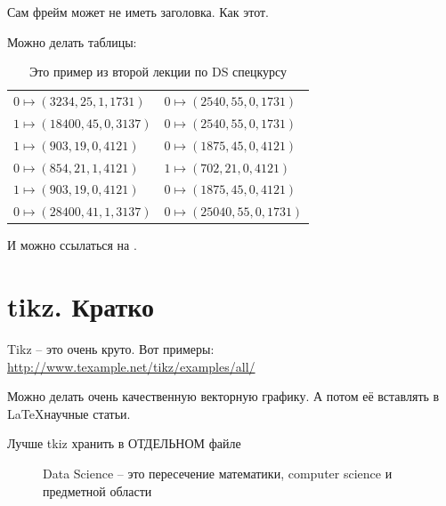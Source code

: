 \begin{frame}
	Сам фрейм может не иметь заголовка. Как этот.
\end{frame}

\begin{frame}
	Можно делать таблицы:

	\begin{center}
	\small 
		\begin{table}
		\begin{tabular}{ l l }
			$0 \mapsto (3234, 25, 1, 1731) $ &  $0 \mapsto (2540, 55, 0, 1731)$ \\
			$1 \mapsto (18400, 45, 0, 3137)$ & $0 \mapsto (2540, 55, 0, 1731)$  \\
			$1 \mapsto (903, 19, 0, 4121)$  & $0 \mapsto (1875, 45, 0, 4121)$  \\
			$0 \mapsto (854, 21, 1, 4121)$  & $1 \mapsto (702, 21, 0, 4121)$  \\
			$1 \mapsto (903, 19, 0, 4121)$  & $0 \mapsto (1875, 45, 0, 4121)$  \\
			$0 \mapsto (28400, 41, 1, 3137)$ & $0 \mapsto (25040, 55, 0, 1731)$  \\
		\end{tabular}
		\caption{Это пример из второй лекции по DS спецкурсу}
		\label{table:example}
		\end{table}
	\end{center}
	И можно ссылаться на .
\end{frame}

 
\section{tikz. Кратко}\label{section:tkiz}

\begin{frame}
Tikz -- это очень круто. Вот примеры: \url{http://www.texample.net/tikz/examples/all/}

Можно делать очень качественную векторную графику. 
А потом её вставлять в \LaTeX научные статьи.

\end{frame}

\begin{frame}
	Лучше tkiz хранить в ОТДЕЛЬНОМ файле
	\begin{center}
		\begin{figure}
			
			\caption{Data Science -- это пересечение математики, computer science и предметной области }
		\end{figure}	
	\end{center}

\end{frame}

